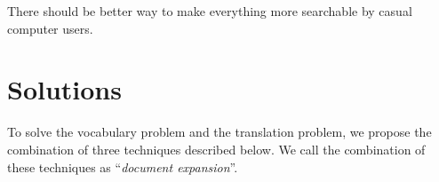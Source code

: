 \documentclass[manuscript,anonymous,review]{acmart}
\begin{document}
There should be better way to make everything more searchable by casual computer users.

\section{Solutions}


To solve the vocabulary problem and the translation problem,
we propose the combination of three techniques described below.
%
We call the combination of these techniques as ``\textit{document expansion}''.
\end{document}
